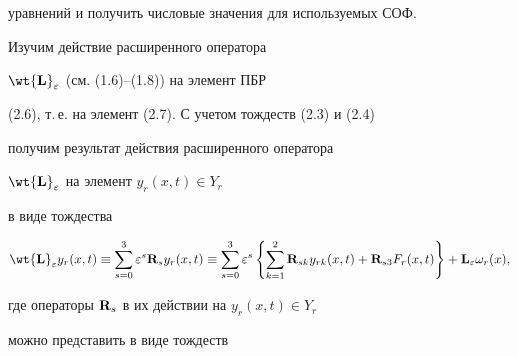 уравнений и получить числовые значения для используемых СОФ.





Изучим действие расширенного оператора


$\wt{\bold L}_{\e}$ (см. (1.6)--(1.8)) на элемент ПБР


(2.6), т.\,е. на элемент (2.7). С учетом тождеств (2.3) и (2.4)


получим результат действия расширенного оператора


$\wt{\bold L}_{\e}$ на элемент $y_r (x, t) \in Y_r$


в виде тождества


\begin{equation}


\wt {\bold L}_{\e} y_r (x, t) \equiv \sum


\limits_{s=0}^3 \e^s \bold{R}_s y_r (x, t)\equiv \sum


\limits_{s=0}^3 \e^s  \left\{ \sum \limits_{k=1} ^2


\bold{R}_{sk} y_{rk} (x, t)


+ \bold{R}_{s3} F_r (x,t) \right\} +\bold{L}_{\e} \omega_r (x),


\end{equation}


где операторы $\bold{R}_{s}$ в их действии на $ y_r (x, t)\in Y_r$


можно представить в виде тождеств


